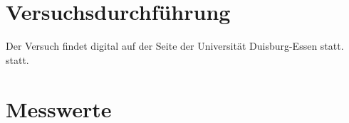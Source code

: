 


\section{Versuchsdurchführung}
Der Versuch findet digital auf der Seite der Universität Duisburg-Essen statt. 
\cite{Hook_Interaktiv} statt.
\section{Messwerte}

\label{sec:Durchführung}



